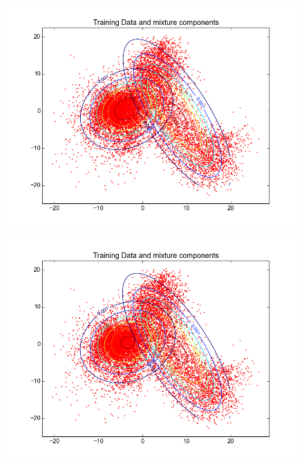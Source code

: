 \documentclass[11pt,a4paper]{article}
\begin{document}
\begin{minipage}[b]{0.25\textwidth}
\begin{figure}[H]
  \centering
  \includegraphics[width=.8\linewidth]{Figures/contours_digitthree15.png}

  \label{fig:sfig1}
\end{figure}%
\end{minipage}
\begin{minipage}[b]{0.25\textwidth}
\begin{figure}[H]
  \centering
  \includegraphics[width=.8\linewidth]{Figures/contours_digitthree20.png}

  \label{fig:sfig1}
\end{figure}%
\end{minipage}
\end{document}
